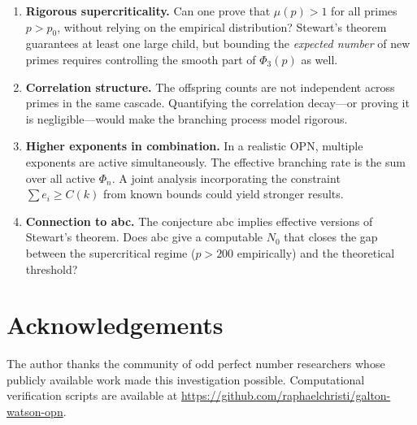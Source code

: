 \documentclass[11pt]{article}
\theoremstyle{definition}
\theoremstyle{remark}
\newcommand{\Phi}{\varPhi}
\begin{document}
\begin{enumerate}
\item \textbf{Rigorous supercriticality.} Can one prove that $\mu(p) > 1$ for all primes $p > p_0$, without relying on the empirical distribution? Stewart's theorem guarantees at least one large child, but bounding the \emph{expected number} of new primes requires controlling the smooth part of $\Phi_3(p)$ as well.

\item \textbf{Correlation structure.} The offspring counts are not independent across primes in the same cascade. Quantifying the correlation decay---or proving it is negligible---would make the branching process model rigorous.

\item \textbf{Higher exponents in combination.} In a realistic OPN, multiple exponents are active simultaneously. The effective branching rate is the sum over all active $\Phi_n$. A joint analysis incorporating the constraint $\sum e_i \geq C(k)$ from known bounds could yield stronger results.

\item \textbf{Connection to abc.} The conjecture abc implies effective versions of Stewart's theorem. Does abc give a computable $N_0$ that closes the gap between the supercritical regime ($p > 200$ empirically) and the theoretical threshold?
\end{enumerate}

\section*{Acknowledgements}

The author thanks the community of odd perfect number researchers whose publicly available work made this investigation possible. Computational verification scripts are available at \url{https://github.com/raphaelchristi/galton-watson-opn}.
\end{document}
